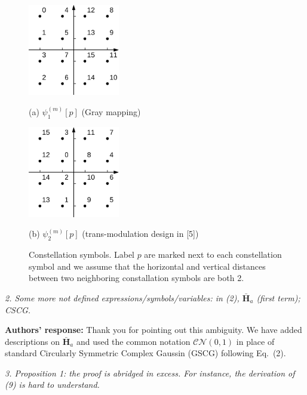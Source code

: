\documentclass[onecolumn, 11pt, draftclsnofoot]{IEEEtran}
\begin{document}
\begin{figure}[htb]
  \begin{minipage}[b]{0.48\linewidth}
    \centering
    \centerline{\includegraphics[width=4.0cm]{./figs/gray.eps}}
    \centerline{(a) $\psi_1^{(m)}[p]$ (Gray mapping)}\medskip
  \end{minipage}
  \hfill
  \begin{minipage}[b]{.48\linewidth}
    \centering
    \centerline{\includegraphics[width=4.0cm]{./figs/karim.eps}}
    \centerline{(b) $\psi_2^{(m)}[p]$ (trans-modulation design in [5])}\medskip
  \end{minipage}
  \caption{Constellation symbols. Label $p$ are marked next to each
  constellation symbol and we assume that the horizontal and vertical
  distances between two neighboring constallation symbols are both 2.}
  \label{fig:mapping}
\end{figure}
\vspace{0.5cm}

\noindent
\emph{2. Some more not defined expressions/symbols/variables: in (2),
$\bar{\mathbf{H}}_a$ (first term); CSCG.}

\noindent \textbf{Authors' response:}
Thank you for pointing out this ambiguity. We have added descriptions on
$\bar{\mathbf{H}}_a$ and used the common notation $\mathcal{CN}(0,1)$
in place of standard Circularly Symmetric Complex Gaussin (GSCG) following
Eq.~(2).

\vspace{0.5cm}

\noindent
\emph{3. Proposition 1: the proof is abridged in excess. For instance, the
derivation of (9) is hard to understand.}
\end{document}
